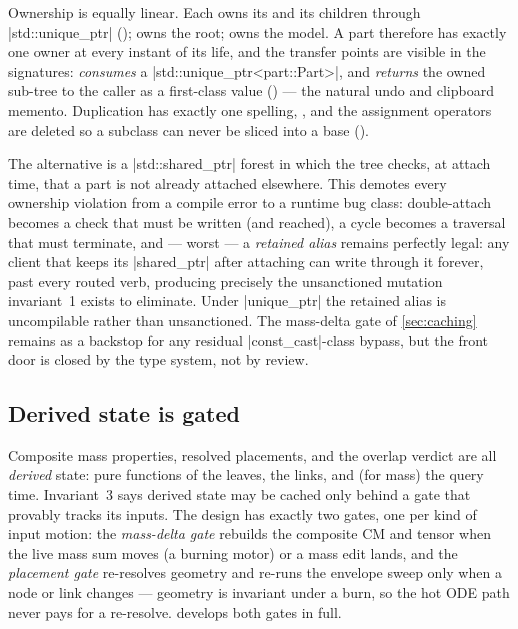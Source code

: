 Ownership is equally linear. Each  owns its  and its children
through \cppinline|std::unique_ptr| (); 
owns the root;  owns the model. A part therefore has exactly one owner at
every instant of its life, and the transfer points are visible in the signatures:
 \emph{consumes} a \cppinline|std::unique_ptr<part::Part>|, and 
\emph{returns} the owned sub-tree to the caller as a first-class value
() --- the natural undo and clipboard memento. Duplication
has exactly one spelling, , and the assignment operators are deleted so a
subclass can never be sliced into a base  ().

\begin{rejected}
The alternative is a \cppinline|std::shared_ptr| forest in which the tree checks, at attach
time, that a part is not already attached elsewhere. This demotes every ownership violation
from a compile error to a runtime bug class: double-attach becomes a check that must be
written (and reached), a cycle becomes a traversal that must terminate, and --- worst --- a
\emph{retained alias} remains perfectly legal: any client that keeps its
\cppinline|shared_ptr| after attaching can write through it forever, past every routed verb,
producing precisely the unsanctioned mutation invariant~1 exists to eliminate. Under
\cppinline|unique_ptr| the retained alias is uncompilable rather than unsanctioned. The
mass-delta gate of \cref{sec:caching} remains as a backstop for any residual
\cppinline|const_cast|-class bypass, but the front door is closed by the type system, not by
review.
\end{rejected}

\subsection{Derived state is gated}\label{sec:philosophy-gates}

Composite mass properties, resolved placements, and the overlap verdict are all
\emph{derived} state: pure functions of the leaves, the links, and (for mass) the query time.
Invariant~3 says derived state may be cached only behind a gate that provably tracks its
inputs. The design has exactly two gates, one per kind of input motion: the \emph{mass-delta
gate} rebuilds the composite CM and tensor when the live mass sum moves (a burning motor) or
a mass edit lands, and the \emph{placement gate} re-resolves geometry and re-runs the envelope
sweep only when a node or link changes --- geometry is invariant under a burn, so the hot ODE
path never pays for a re-resolve.  develops both gates in full.

